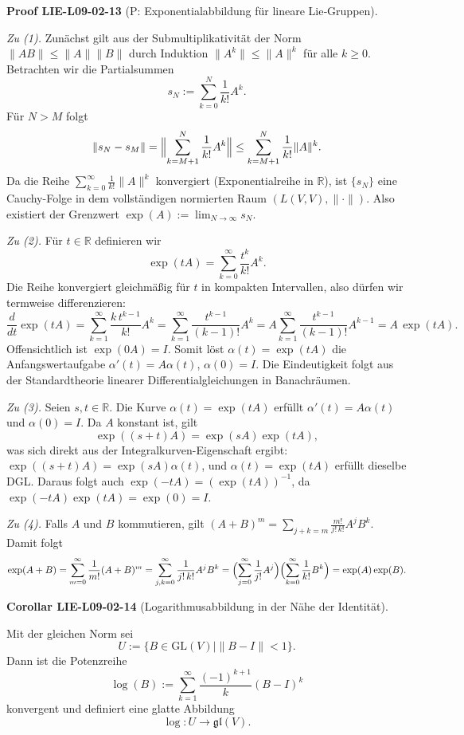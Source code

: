 \documentclass[10pt, letterpaper]{article}
\newcommand{\GL}{\mathrm{GL}}
\newcommand{\CustomHeading}[3]{%
  \par\medskip\noindent%
  \textbf{#1 #2} \textnormal{(#3)}.\enskip%
}
\newenvironment{KORO}[2]{\CustomHeading{Corollar}{#1}{#2}}{}
\newenvironment{PROOF}[2]{\CustomHeading{Proof}{#1}{#2}}{}
\begin{document}
\begin{PROOF}{LIE-L09-02-13}{P: Exponentialabbildung für lineare Lie‐Gruppen}
\emph{Zu (1).}
Zunächst gilt aus der Submultiplikativität der Norm $\|AB\|\le \|A\|\|B\|$
durch Induktion $\|A^k\|\le \|A\|^k$ für alle $k\ge 0$.  
Betrachten wir die Partialsummen
\[
s_N:=\sum_{k=0}^{N}\frac{1}{k!}A^k.
\]
Für $N>M$ folgt
\[
\|s_N-s_M\|
=\Bigl\|\sum_{k=M+1}^{N}\frac{1}{k!}A^k\Bigr\|
\le \sum_{k=M+1}^{N}\frac{1}{k!}\|A\|^k.
\]
Da die Reihe $\sum_{k=0}^{\infty}\frac{1}{k!}\|A\|^k$ konvergiert (Exponentialreihe in $\mathbb R$),
ist $\{s_N\}$ eine Cauchy-Folge in dem vollständigen normierten Raum $(L(V,V),\|\cdot\|)$.
Also existiert der Grenzwert $\exp(A):=\lim_{N\to\infty}s_N$.

\smallskip
\emph{Zu (2).}
Für $t\in\mathbb R$ definieren wir
\[
\exp(tA)=\sum_{k=0}^{\infty}\frac{t^k}{k!}A^k.
\]
Die Reihe konvergiert gleichmäßig für $t$ in kompakten Intervallen, also dürfen wir
termweise differenzieren:
\[
\frac{d}{dt}\exp(tA)
=\sum_{k=1}^{\infty}\frac{k\,t^{k-1}}{k!}A^k
=\sum_{k=1}^{\infty}\frac{t^{k-1}}{(k-1)!}A^k
=A\sum_{k=1}^{\infty}\frac{t^{k-1}}{(k-1)!}A^{k-1}
=A\,\exp(tA).
\]
Offensichtlich ist $\exp(0A)=I$. Somit löst $\alpha(t)=\exp(tA)$ die Anfangswertaufgabe
$\alpha'(t)=A\alpha(t)$, $\alpha(0)=I$.
Die Eindeutigkeit folgt aus der Standardtheorie linearer Differentialgleichungen in Banachräumen.

\smallskip
\emph{Zu (3).}
Seien $s,t\in\mathbb R$. Die Kurve $\alpha(t)=\exp(tA)$ erfüllt $\alpha'(t)=A\alpha(t)$ und $\alpha(0)=I$.
Da $A$ konstant ist, gilt
\[
\exp((s+t)A)=\exp(sA)\exp(tA),
\]
was sich direkt aus der Integralkurven-Eigenschaft ergibt:
$\exp((s+t)A)=\exp(sA)\alpha(t)$, und $\alpha(t)=\exp(tA)$ erfüllt dieselbe DGL.
Daraus folgt auch $\exp(-tA)=(\exp(tA))^{-1}$, da $\exp(-tA)\exp(tA)=\exp(0)=I$.

\smallskip
\emph{Zu (4).}
Falls $A$ und $B$ kommutieren, gilt $(A+B)^m=\sum_{j+k=m}\frac{m!}{j!\,k!}A^jB^k$.
Damit folgt
\[
\exp(A+B)
=\sum_{m=0}^{\infty}\frac{1}{m!}(A+B)^m
=\sum_{j,k=0}^{\infty}\frac{1}{j!\,k!}A^jB^k
=\Bigl(\sum_{j=0}^{\infty}\frac{1}{j!}A^j\Bigr)\Bigl(\sum_{k=0}^{\infty}\frac{1}{k!}B^k\Bigr)
=\exp(A)\exp(B).
\]
\end{PROOF}

\begin{KORO}{LIE-L09-02-14}{Logarithmusabbildung in der Nähe der Identität}
Mit der gleichen Norm sei
\[
U:=\{B\in\GL(V)\mid \|B-I\|<1\}.
\]
Dann ist die Potenzreihe
\[
\log(B):=\sum_{k=1}^{\infty}\frac{(-1)^{k+1}}{k}(B-I)^k
\]
konvergent und definiert eine glatte Abbildung
\[
\log:U\to \mathfrak{gl}(V).
\]
\end{KORO}
\end{document}
